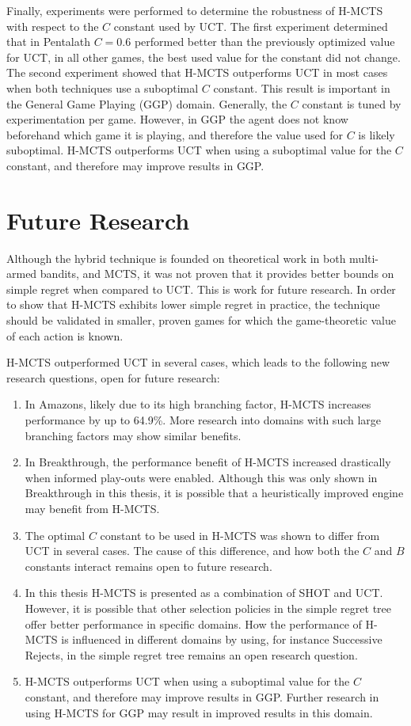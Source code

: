 \documentclass{kecsmstr}
\begin{document}
Finally, experiments were performed to determine the robustness of H-MCTS with respect to the $C$ constant used by UCT. The first experiment determined that in Pentalath $C=0.6$ performed better than the previously optimized value for UCT, in all other games, the best used value for the constant did not change. The second experiment showed that H-MCTS outperforms UCT in most cases when both techniques use a suboptimal $C$ constant. This result is important in the General Game Playing (GGP) domain. Generally, the $C$ constant is tuned by experimentation per game. However, in GGP the agent does not know beforehand which game it is playing, and therefore the value used for $C$ is likely suboptimal. H-MCTS outperforms UCT when using a suboptimal value for the $C$ constant, and therefore may improve results in GGP.

\section{Future Research}

Although the hybrid technique is founded on theoretical work in both multi-armed bandits, and MCTS, it was not proven that it provides better bounds on simple regret when compared to UCT. This is work for future research. In order to show that H-MCTS exhibits lower simple regret in practice, the technique should be validated in smaller, proven games for which the game-theoretic value of each action is known. 

H-MCTS outperformed UCT in several cases, which leads to the following new research questions, open for future research:
\begin{enumerate}
\item In Amazons, likely due to its high branching factor, H-MCTS increases performance by up to 64.9\%. More research into domains with such large branching factors may show similar benefits.
\item In Breakthrough, the performance benefit of H-MCTS increased drastically when informed play-outs were enabled. Although this was only shown in Breakthrough in this thesis, it is possible that a heuristically improved engine may benefit from H-MCTS.
\item The optimal $C$ constant to be used in H-MCTS was shown to differ from UCT in several cases. The cause of this difference, and how both the $C$ and $B$ constants interact remains open to future research.
\item In this thesis H-MCTS is presented as a combination of SHOT and UCT. However, it is possible that other selection policies in the simple regret tree offer better performance in specific domains. How the performance of H-MCTS is influenced in different domains by using, for instance Successive Rejects, in the simple regret tree remains an open research question.
\item H-MCTS outperforms UCT when using a suboptimal value for the $C$ constant, and therefore may improve results in GGP. Further research in using H-MCTS for GGP may result in improved results in this domain.
\end{enumerate}
\end{document}
